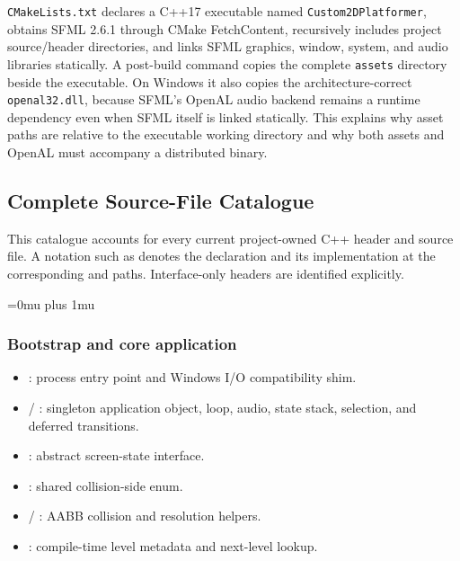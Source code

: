 \texttt{CMakeLists.txt} declares a C++17 executable named
\texttt{Custom2DPlatformer}, obtains SFML 2.6.1 through CMake FetchContent,
recursively includes project source/header directories, and links SFML graphics,
window, system, and audio libraries statically.  A post-build command copies
the complete \texttt{assets} directory beside the executable.  On Windows it
also copies the architecture-correct \texttt{openal32.dll}, because SFML's
OpenAL audio backend remains a runtime dependency even when SFML itself is
linked statically.  This explains why asset paths are relative to the executable
working directory and why both assets and OpenAL must accompany a distributed
binary.

\subsection{Complete Source-File Catalogue}
\label{subsec:source-file-catalogue}

This catalogue accounts for every current project-owned C++ header and source
file.  A notation such as  denotes the declaration and its
implementation at the corresponding  and  paths.
Interface-only headers are identified explicitly.

\begingroup
\Urlmuskip=0mu plus 1mu\relax

\subsubsection{Bootstrap and core application}

\begin{itemize}
    \item {}: process entry point and Windows I/O
    compatibility shim.
    \item {} /
    : singleton application object, loop, audio,
    state stack, selection, and deferred transitions.
    \item {}: abstract screen-state interface.
    \item {}: shared collision-side enum.
    \item {} /
    : AABB collision and resolution helpers.
    \item {}: compile-time level metadata and
    next-level lookup.
\end{itemize}

